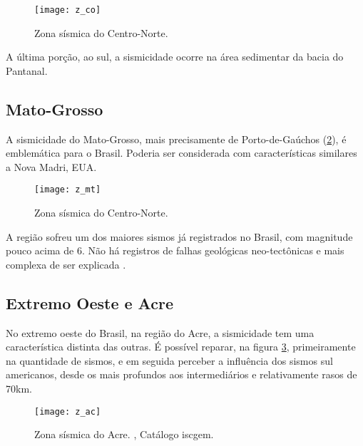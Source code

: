 \begin{figure}[H]
  \centering
  \texttt{[image: z\_co]} 
  \caption{Zona sísmica do Centro-Norte. \citet{dourado_2014}}
  \label{fig:z_cn} 
\end{figure}

A última porção, ao sul, a sismicidade ocorre na área sedimentar da bacia do Pantanal.

\subsection{Mato-Grosso}
\label{sec:z_mt}

A sismicidade do Mato-Grosso, mais precisamente de Porto-de-Gaúchos (\ref{fig:z_mt}), é emblemática para o Brasil.
Poderia ser considerada com características similares a Nova Madri, EUA.

\begin{figure}[H]
  \centering
  \texttt{[image: z\_mt]} 
  \caption{Zona sísmica do Centro-Norte. \citet{dourado_2014}}
  \label{fig:z_mt} 
\end{figure}

A região sofreu um dos maiores sismos já registrados no Brasil, com magnitude pouco acima de 6.
Não há registros de falhas geológicas neo-tectônicas e mais complexa de ser explicada \citep{barros_2009}.

\subsection{Extremo Oeste e Acre}
\label{sec:z_ac}

No extremo oeste do Brasil, na região do Acre, a sismicidade tem uma característica distinta das outras.
É possível reparar, na figura \ref{fig:z_ac}, primeiramente na quantidade de sismos, e em
seguida perceber a influência dos sismos sul americanos, desde os mais profundos aos intermediários
e relativamente rasos de 70km. 


\begin{figure}[H]
  \centering
  \texttt{[image: z\_ac]} 
  \caption{Zona sísmica do Acre. \citet{dourado_2014}, Catálogo \gls*{iscgem}.}
  \label{fig:z_ac} 
\end{figure}

